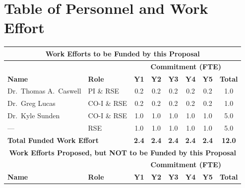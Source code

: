 \documentclass[12pt]{article}
\numberwithin{page}{section}
\begin{document}
\newpage



\newpage

\section{Table of Personnel and Work Effort}
\setcounter{page}{1}

\begin{tabular}{|l|l|c|c|c|c|c|c|}
  \hline
  \multicolumn{8}{|c|}{\cellcolor{gray!30}\textbf{Work Efforts to be Funded by this Proposal}}\\
  \hline
  \cellcolor{gray!30} &  \cellcolor{gray!30}&\multicolumn{6}{c|}{\cellcolor{gray!30}\textbf{Commitment (FTE)}} \\
  \hhline{|*2{>{\arrayrulecolor{gray!30}}-}*4{>{\arrayrulecolor{black}}-}|}
  \cellcolor{gray!30}\textbf{Name }& \cellcolor{gray!30}\textbf{Role} & \cellcolor{gray!30}\textbf{Y1} & \cellcolor{gray!30}\textbf{Y2} & \cellcolor{gray!30}\textbf{Y3}& \cellcolor{gray!30}\textbf{Y4}& \cellcolor{gray!30}\textbf{Y5} & \cellcolor{gray!30}\textbf{Total}     \\  \hline
  Dr.\ Thomas A.\ Caswell & PI \& RSE   & 0.2 & 0.2 & 0.2 & 0.2 & 0.2 & 1.0 \\  \hline
  Dr.\ Greg Lucas         & CO-I \& RSE & 0.2 & 0.2 & 0.2 & 0.2 & 0.2 & 1.0 \\  \hline
  Dr.\ Kyle Sunden        & CO-I \& RSE & 1.0 & 1.0 & 1.0 & 1.0 & 1.0 & 5.0 \\  \hline
  ---                     & RSE         & 1.0 & 1.0 & 1.0 & 1.0 & 1.0 & 5.0 \\  \hline
  \multicolumn{2}{|l|}{\textbf{Total Funded Work Effort}} & \textbf{2.4}& \textbf{2.4}& \textbf{2.4}& \textbf{2.4}& \textbf{2.4} &  \textbf{12.0}\\    \hline
  \multicolumn{8}{|c|}{\cellcolor{gray!30}\textbf{Work Efforts Proposed, but NOT to be Funded by this Proposal}}\\  \hline
  \cellcolor{gray!30} &  \cellcolor{gray!30}&\multicolumn{6}{c|}{\cellcolor{gray!30}\textbf{Commitment (FTE)}} \\
  \hhline{|*2{>{\arrayrulecolor{gray!30}}-}*4{>{\arrayrulecolor{black}}-}|}
  \cellcolor{gray!30}\textbf{Name }& \cellcolor{gray!30}\textbf{Role} & \cellcolor{gray!30}\textbf{Y1} & \cellcolor{gray!30}\textbf{Y2} & \cellcolor{gray!30}\textbf{Y3}& \cellcolor{gray!30}\textbf{Y4}& \cellcolor{gray!30}\textbf{Y5} & \cellcolor{gray!30}\textbf{Total}     \\  \hline

\end{tabular}
\end{document}

